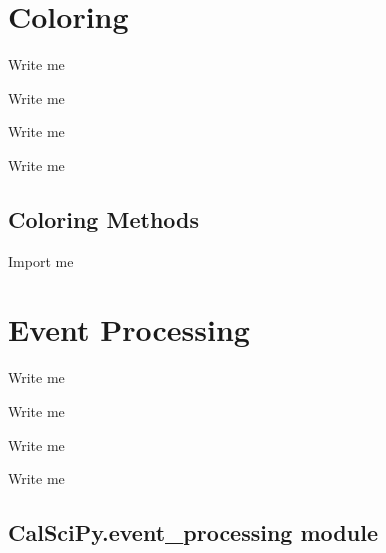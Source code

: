 \documentclass[letterpaper,10pt,english]{sphinxmanual}
\begin{document}
\section{Coloring}
\label{\detokenize{Sub-Packages:coloring}}\label{\detokenize{Sub-Packages:coloring-module}}
\begin{DUlineblock}{0em}
\item[] Write me
\item[] Write me
\item[] Write me
\item[] Write me
\end{DUlineblock}


\subsection{Coloring Methods}
\label{\detokenize{Sub-Packages:coloring-methods}}
\begin{DUlineblock}{0em}
\item[] Import me
\end{DUlineblock}


\section{Event Processing}
\label{\detokenize{Sub-Packages:event-processing}}\label{\detokenize{Sub-Packages:event-processing-module}}
\begin{DUlineblock}{0em}
\item[] Write me
\item[] Write me
\item[] Write me
\item[] Write me
\end{DUlineblock}

\sphinxstepscope


\subsection{CalSciPy.event\_processing module}
\label{\detokenize{CalSciPy.event_processing:module-CalSciPy.event_processing}}\label{\detokenize{CalSciPy.event_processing:calscipy-event-processing-module}}\label{\detokenize{CalSciPy.event_processing::doc}}
\end{document}
